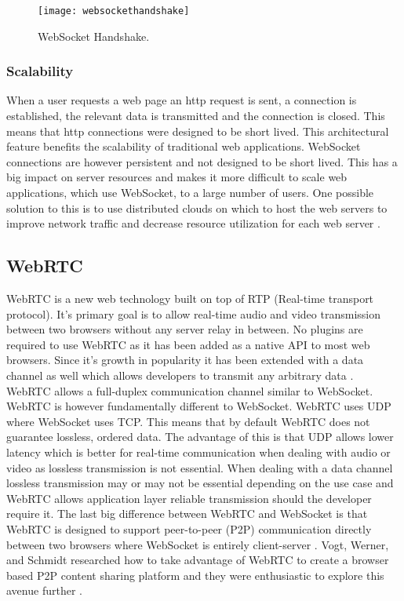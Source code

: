 \documentclass[prodmode,acmtecs]{acmsmall}
\begin{document}
\begin{figure}
\centerline{\texttt{[image: websockethandshake]}}
\caption{WebSocket Handshake.}
\label{figure:one}
\end{figure}

\subsubsection{Scalability}
When a user requests a web page an http request is sent, a connection is established, the relevant data is transmitted and the connection is closed. This means that http connections were designed to be short lived. This architectural feature benefits the scalability of traditional web applications. WebSocket connections are however persistent and not designed to be short lived. This has a big impact on server resources and makes it more difficult to scale web applications, which use WebSocket, to a large number of users. One possible solution to this is to use distributed clouds on which to host the web servers to improve network traffic and decrease resource utilization for each web server \cite{solomon2012distributed}. 



\subsection{WebRTC}
WebRTC is a new web technology built on top of RTP (Real-time transport protocol). It's primary goal is to allow real-time audio and video transmission between two browsers without any server relay in between. No plugins are required to use WebRTC as it has been added as a native API to most web browsers. Since it's growth in popularity it has been extended with a data channel as well which allows developers to transmit any arbitrary data \cite{karadogan2014evaluating}.\\

WebRTC allows a full-duplex communication channel similar to WebSocket. WebRTC is however fundamentally different to WebSocket. WebRTC uses UDP where WebSocket uses TCP. This means that by default WebRTC does not guarantee lossless, ordered data. The advantage of this is that UDP allows lower latency which is better for real-time communication when dealing with audio or video as lossless transmission is not essential. When dealing with a data channel lossless transmission may or may not be essential depending on the use case and WebRTC allows application layer reliable transmission should the developer require it. The last big difference between WebRTC and WebSocket is that WebRTC is designed to support peer-to-peer (P2P) communication directly between two browsers where WebSocket is entirely client-server \cite{karadogan2014evaluating}. Vogt, Werner, and Schmidt researched how to take advantage of WebRTC to create a browser based P2P content sharing platform and they were enthusiastic to explore this avenue further \cite{vogt2013leveraging}.
\end{document}
